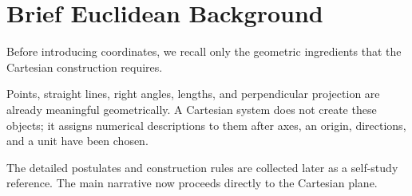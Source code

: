 \section{Brief Euclidean Background}

Before introducing coordinates, we recall only the geometric ingredients that the Cartesian construction requires.

\begin{corebox}
Points, straight lines, right angles, lengths, and perpendicular projection are already meaningful geometrically. A Cartesian system does not create these objects; it assigns numerical descriptions to them after axes, an origin, directions, and a unit have been chosen.
\end{corebox}

The detailed postulates and construction rules are collected later as a self-study reference. The main narrative now proceeds directly to the Cartesian plane.

